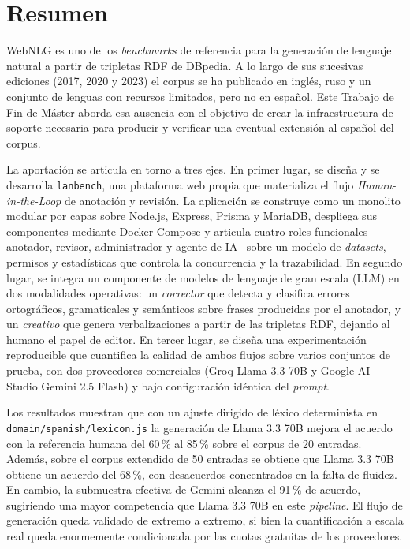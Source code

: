 \chapter*{Resumen}

WebNLG es uno de los \textit{benchmarks} de referencia para la generación de
lenguaje natural a partir de tripletas RDF de DBpedia. A lo largo de sus
sucesivas ediciones (2017, 2020 y 2023) el corpus se ha publicado en inglés,
ruso y un conjunto de lenguas con recursos limitados, pero no en español. Este
Trabajo de Fin de Máster aborda esa ausencia con el objetivo de crear la
infraestructura de soporte necesaria para producir y verificar una eventual
extensión al español del corpus.

La aportación se articula en torno a tres ejes. En primer lugar, se diseña y se
desarrolla \texttt{lanbench}, una plataforma web propia que materializa el
flujo \textit{Human-in-the-Loop} de anotación y revisión. La aplicación se
construye como un monolito modular por capas sobre Node.js, Express, Prisma y
MariaDB, despliega sus componentes mediante Docker Compose y articula cuatro
roles funcionales --anotador, revisor, administrador y agente de IA-- sobre un
modelo de \textit{datasets}, permisos y estadísticas que controla la
concurrencia y la trazabilidad. En segundo lugar, se integra un componente de
modelos de lenguaje de gran escala (LLM) en dos modalidades operativas: un
\textit{corrector} que detecta y clasifica errores ortográficos, gramaticales y
semánticos sobre frases producidas por el anotador, y un \textit{creativo} que
genera verbalizaciones a partir de las tripletas RDF, dejando al humano el
papel de editor. En tercer lugar, se diseña una experimentación reproducible
que cuantifica la calidad de ambos flujos sobre varios conjuntos de prueba, con
dos proveedores comerciales (Groq Llama 3.3 70B y Google AI Studio Gemini 2.5
Flash) y bajo configuración idéntica del \textit{prompt}.

Los resultados muestran que con un ajuste dirigido de léxico determinista en
\texttt{domain/\allowbreak spanish/\allowbreak lexicon.js} la generación de Llama 3.3 70B mejora el
acuerdo con la referencia humana del 60\,\% al 85\,\% sobre el corpus de 20
entradas. Además, sobre el corpus extendido de 50 entradas se obtiene que Llama
3.3 70B obtiene un acuerdo del 68\,\%, con desacuerdos concentrados en la
falta de fluidez. En cambio, la submuestra efectiva de Gemini alcanza el 91\,\%
de acuerdo, sugiriendo una mayor competencia que Llama 3.3 70B en este
\textit{pipeline}. El flujo de generación queda validado de extremo a extremo,
si bien la cuantificación a escala real queda enormemente condicionada por las
cuotas gratuitas de los proveedores.

